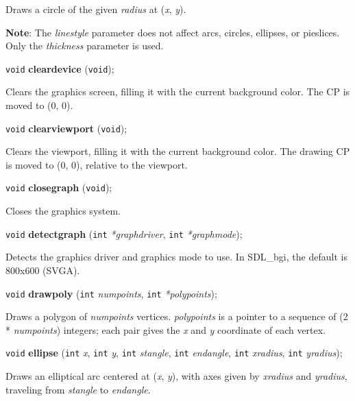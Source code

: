 \documentclass[a4paper,11pt]{article}
\newcommand{\SDLbgi}{SDL\_bgi}
\newcommand{\V}{\texttt{void}}      %
\newcommand{\I}{\texttt{int}}       %
\newcommand{\func}[1]{\textbf{#1}}  %
\newcommand{\A}[1]{\emph{#1}}       %
\newenvironment{bgi}
{ %
  \begin{snugshade}
}
{ %
  \end{snugshade}
}
\begin{document}
Draws a circle of the given \A{radius} at (\A{x}, \A{y}).

\textbf{Note}: The \A{linestyle} parameter does not affect arcs,
circles, ellipses, or pie\-slices. Only the \A{thickness} parameter is
used.


\begin{bgi}
\V{} \func{cleardevice} (\V{});
\end{bgi}

Clears the graphics screen, filling it with the current background
color. The CP is moved to (0, 0).


\begin{bgi}
\V{} \func{clearviewport} (\V{});
\end{bgi}

Clears the viewport, filling it with the current background color. The
drawing CP is moved to (0, 0), relative to the viewport.


\begin{bgi}
\V{} \func{closegraph} (\V{});
\end{bgi}

Closes the graphics system.


\begin{bgi}
\V{} \func{detectgraph} (\I{} \A{*graphdriver}, \I{} \A{*graphmode});
\end{bgi}

Detects the graphics driver and graphics mode to use. In \SDLbgi, the
default is 800x600 (SVGA).


\begin{bgi}
\V{} \func{drawpoly} (\I{} \A{numpoints}, \I{} \A{*polypoints});
\end{bgi}

Draws a polygon of \A{numpoints} vertices. \A{polypoints} is a
pointer to a sequence of (2 * \A{numpoints}) integers; each pair gives
the \A{x} and \A{y} coordinate of each vertex.


\begin{bgi}
\V{} \func{ellipse} (\I{} \A{x}, \I{} \A{y}, \I{} \A{stangle}, \I{}
\A{endangle}, \I{} \A{xradius}, \I{} \A{yradius});
\end{bgi}

Draws an elliptical arc centered at (\A{x}, \A{y}), with axes given by
\A{xradius} and \A{yradius}, traveling from \A{stangle} to
\A{endangle}.
\end{document}
